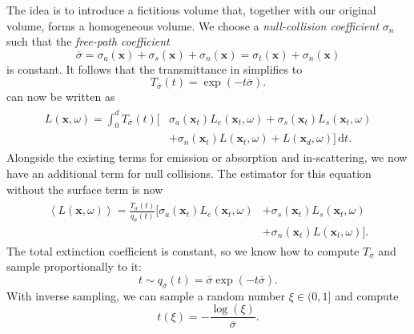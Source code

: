 The idea is to introduce a fictitious volume that, together with our original
volume, forms a homogeneous volume. We choose a \emph{null-collision coefficient}
$\sigma_n$ such that the \emph{free-path coefficient}
\begin{equation}
    \overline\sigma
        = \sigma_a(\mathbf{x}) + \sigma_s(\mathbf{x}) + \sigma_n(\mathbf{x})
        = \sigma_t(\mathbf{x}) + \sigma_n(\mathbf{x}) 
\end{equation}
is constant. It follows that the transmittance in 
simplifies to
\begin{equation}
    T_{\overline\sigma}(t) = \exp(-t \overline\sigma).
\end{equation}
 can now be written as
\begin{align}
\begin{split}
    \label{eq:null_vre}
    L(\mathbf{x}, \omega) =
        \int_0^d T_{\overline\sigma}(t) \bigg[
            &\sigma_a(\mathbf{x}_t) L_e(\mathbf{x}_t, \omega)
            + \sigma_s(\mathbf{x}_t) L_s(\mathbf{x}_t, \omega) \\
            &+ \sigma_n(\mathbf{x}_t) L(\mathbf{x}_t, \omega)
            + L(\mathbf{x}_d, \omega)
        \bigg]\, \mathrm{d}t.
\end{split}
\end{align}
Alongside the existing terms for emission or absorption and in-scattering,
we now have an additional term for null collisions. The estimator for this
equation without the surface term is now
\begin{align}
\begin{split}
    \label{eq:vre_mc}
    \left\langle L(\mathbf{x}, \omega) \right\rangle =
        \frac{T_{\overline\sigma}(t)}{q_{\overline\sigma}(t)} 
        \bigg[
            \sigma_a(\mathbf{x}_t) L_e(\mathbf{x}_t, \omega)  
            &+ \sigma_s(\mathbf{x}_t) L_s(\mathbf{x}_t, \omega) \\
            &+ \sigma_n(\mathbf{x}_t) L(\mathbf{x}_t, \omega)
        \bigg].
\end{split}
\end{align}
The total extinction coefficient is constant, so we know how to compute
$T_{\overline\sigma}$ and sample proportionally to it:
\begin{equation}
    \label{eq:q_pdf}
    t \sim q_{\overline\sigma}(t) = \overline\sigma \exp(-t \overline\sigma).
\end{equation}
With inverse sampling, we can sample a random number $\xi \in (0, 1]$ and compute
\begin{equation}
    t(\xi) = -\frac{\log(\xi)}{\overline\sigma}.
\end{equation}

